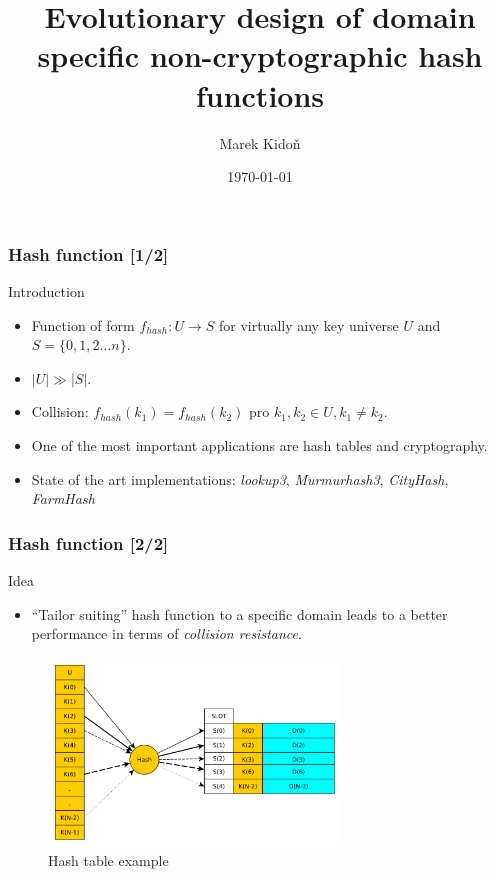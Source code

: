 \documentclass[11pt]{beamer}
\author{Marek Kidoň}
\title{Evolutionary design of domain specific non-cryptographic hash functions}
\subtitle{}
\institute{Brno University of Technology}
\date{\today}
\begin{document}
	\begin{frame}[plain]
		\titlepage
		 \addtocounter{framenumber}{-1}
	\end{frame}
	\begin{frame}
		\frametitle{Hash function [1/2]}
		\begin{block}{Introduction} 
		\begin{itemize}[<+->]
			\item Function of form $f_{hash} : U \to S$ for virtually any  key universe $U$ and $S = \{ 0,1,2 \ldots n \}$.
			\item $|U| \gg |S|$.
			\item Collision: $f_{hash}(k_1) = f_{hash}(k_2)$ pro $k_1, k_2 \in U, k_1 \neq k_2$.
			\item One of the most important applications are hash tables and cryptography.
			\item State of the art implementations: \textit{lookup3}, \textit{Murmurhash3}, \textit{CityHash}, \textit{FarmHash}
		\end{itemize}
		\end{block}
	\end{frame}
	
	\begin{frame}
		\frametitle{Hash function [2/2]}
		\begin{block}{Idea} 
			\begin{itemize}[<+->]
				\item ``Tailor suiting'' hash function to a specific domain leads to a better performance in terms of
					\textit{collision resistance}. 
			\end{itemize}
		\end{block}
		\begin{figure}
		\centering
		\includegraphics[height=5cm]{fig/hash_table_example}
		\caption{Hash table example}
		\end{figure}
	\end{frame}
	
\end{document}
